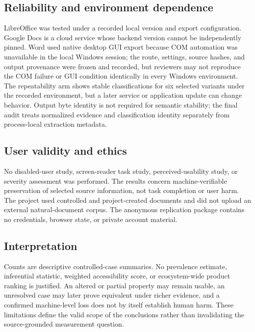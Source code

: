 \subsection{Reliability and environment dependence}
LibreOffice was tested under a recorded local version and export configuration. Google Docs is a cloud service whose backend version cannot be independently pinned. Word used native desktop GUI export because COM automation was unavailable in the local Windows session; the route, settings, source hashes, and output provenance were frozen and recorded, but reviewers may not reproduce the COM failure or GUI condition identically in every Windows environment. The repeatability arm shows stable classifications for six selected variants under the recorded environment, but a later service or application update can change behavior. Output byte identity is not required for semantic stability; the final audit treats normalized evidence and classification identity separately from process-local extraction metadata.

\subsection{User validity and ethics}
No disabled-user study, screen-reader task study, perceived-usability study, or severity assessment was performed. The results concern machine-verifiable preservation of selected source information, not task completion or user harm. The project used controlled and project-created documents and did not upload an external natural-document corpus. The anonymous replication package contains no credentials, browser state, or private account material.

\subsection{Interpretation}
Counts are descriptive controlled-case summaries. No prevalence estimate, inferential statistic, weighted accessibility score, or ecosystem-wide product ranking is justified. An altered or partial property may remain usable, an unresolved case may later prove equivalent under richer evidence, and a confirmed machine-level loss does not by itself establish human harm. These limitations define the valid scope of the conclusions rather than invalidating the source-grounded measurement question.
